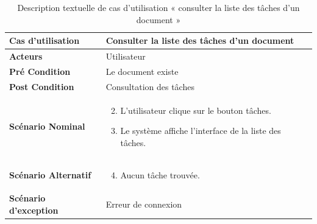 
\begin{longtable}{|p{5cm}|p{10cm}|}
  \caption{Description textuelle de cas d'utilisation « consulter la liste des tâches d'un document »} \label{tab:DescriptionTextuelleDeCasDUtilisationConsulterLaListeDesTachesDUnDocument} \\
\hline
\textbf{Cas d'utilisation}&Consulter la liste des tâches d'un document\\
\hline
\textbf{Acteurs}&Utilisateur\\
\hline
\textbf{Pré Condition}&Le document existe\\
\hline
\textbf{Post Condition}&Consultation des tâches\\
\hline
\textbf{Scénario Nominal}&
\vspace{-\baselineskip}
\begin{enumerate}
    \setcounter{enumi}{1}
    \item L'utilisateur clique sur le bouton tâches.
    \item Le système affiche l'interface de la liste des tâches.
    
\end{enumerate}\\
\hline
\textbf{Scénario Alternatif}&
\vspace{-\baselineskip}
\begin{enumerate}
    \setcounter{enumi}{3}
    \item Aucun tâche trouvée.
\end{enumerate}\\
\hline
\textbf{Scénario d'exception}&Erreur de connexion\\
\hline

\end{longtable}




